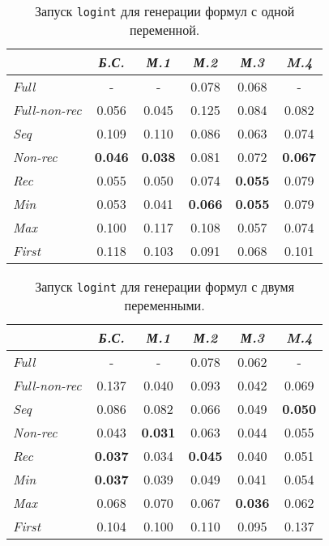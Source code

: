 \begin{table}[h!]
\center
\begin{tabular}{|l|c|c|c|c|c|}
\hline
   &{\it Б.С.}&{\it М.1}&{\it М.2}&{\it М.3}&{\it M.4} \\ \hline
{\it Full        }&    -         &     -        & 0.078       & 0.068 &    -  \\ \hline
{\it Full-non-rec}& 0.056        &  0.045       & 0.125       & 0.084 & 0.082 \\ \hline
{\it Seq         }& 0.109        &  0.110       & 0.086       & 0.063 & 0.074 \\ \hline
{\it Non-rec     }& {\bf 0.046}  &  {\bf 0.038} & 0.081       & 0.072 & {\bf 0.067} \\ \hline
{\it Rec         }& 0.055        &  0.050       & 0.074       & {\bf 0.055} & 0.079 \\ \hline
{\it Min         }& 0.053        &  0.041       & {\bf 0.066} & {\bf 0.055} & 0.079 \\ \hline
{\it Max         }& 0.100        &  0.117       & 0.108       & 0.057 & 0.074 \\ \hline
{\it First       }& 0.118        &  0.103       & 0.091       & 0.068 & 0.101 \\ \hline
\end{tabular}
\caption{Запуск \lstinline{logint} для генерации формул с одной переменной.}
\label{fig:logintTest2}
\end{table}

\begin{table}[h!]
\center
\begin{tabular}{|l|c|c|c|c|c|}
\hline
   &{\it Б.С.}&{\it М.1}&{\it М.2}&{\it М.3}&{\it M.4} \\ \hline
{\it Full        }&    -        &    -        & 0.078       & 0.062      &    - \\ \hline
{\it Full-non-rec}& 0.137       & 0.040       & 0.093       & 0.042      & 0.069 \\ \hline
{\it Seq         }& 0.086       & 0.082       & 0.066       & 0.049      & {\bf 0.050} \\ \hline
{\it Non-rec     }& 0.043       & {\bf 0.031} & 0.063       & 0.044      & 0.055 \\ \hline
{\it Rec         }& {\bf 0.037} & 0.034       & {\bf 0.045} & 0.040      & 0.051 \\ \hline
{\it Min         }& {\bf 0.037} & 0.039       & 0.049       & 0.041      & 0.054 \\ \hline
{\it Max         }& 0.068       & 0.070       & 0.067       &{\bf 0.036} & 0.062 \\ \hline
{\it First       }& 0.104       & 0.100       & 0.110       & 0.095      & 0.137 \\ \hline
\end{tabular}
\caption{Запуск \lstinline{logint} для генерации формул с двумя переменными.}
\label{fig:logintTest3}
\end{table}

